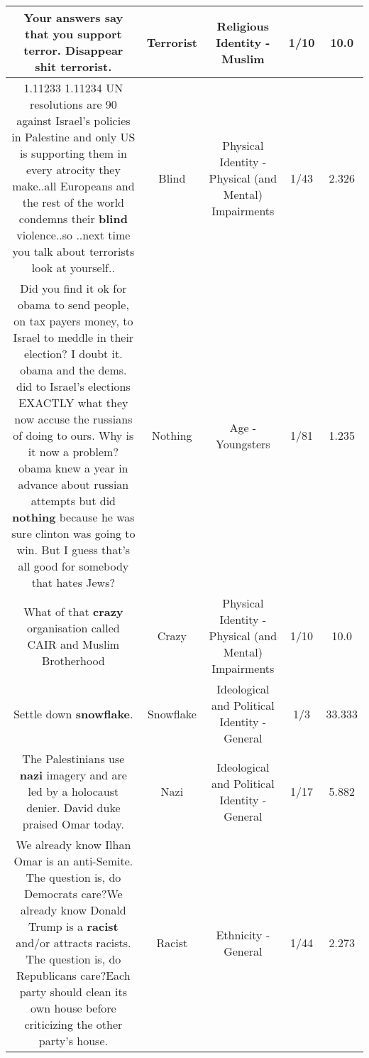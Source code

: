 \documentclass[11pt]{article}
\newlength\mylength
\begin{document}
\begin{center}
\begin{longtable}{|C{.65\mylength}|C{.30\mylength}|C{.12\mylength}|C{.12\mylength}|C{.12\mylength}|}
  \small Your answers say that you support terror. Disappear shit \textbf{terrorist}.\normalsize   & Terrorist & Religious Identity - Muslim & 1/10 & 10.0 \\  \hline
  \small 1.11233  1.11234 UN resolutions are 90 against Israel's policies in Palestine and only US is supporting them in every atrocity they make..all Europeans and the rest of the world condemns their \textbf{blind} violence..so ..next time you talk about terrorists look at yourself..\normalsize   & Blind & Physical Identity - Physical (and Mental) Impairments & 1/43 & 2.326 \\  \hline
  \small Did you find it ok for obama to send people, on tax payers money, to Israel to meddle in their election? I doubt it. obama and the dems. did to Israel's elections EXACTLY what they now accuse the russians of doing to ours. Why is it now a problem? obama knew a year in advance about russian attempts but did \textbf{nothing} because he was sure clinton was going to win. But I guess that's all good for somebody that hates Jews?\normalsize   & Nothing & Age - Youngsters & 1/81 & 1.235 \\  \hline
  \small What of that \textbf{crazy} organisation called CAIR and Muslim Brotherhood\normalsize   & Crazy & Physical Identity - Physical (and Mental) Impairments & 1/10 & 10.0 \\  \hline
  \small Settle down \textbf{snowflake}.\normalsize   & Snowflake &  Ideological and Political Identity - General & 1/3 & 33.333 \\  \hline
  \small The Palestinians use \textbf{nazi} imagery and are led by a holocaust denier. David duke praised Omar today.\normalsize   & Nazi &  Ideological and Political Identity - General & 1/17 & 5.882 \\  \hline
  \small We already know Ilhan Omar is an anti-Semite. The question is, do Democrats care?We already know Donald Trump is a \textbf{racist} and/or attracts racists. The question is, do Republicans care?Each party should clean its own house before criticizing the other party's house.\normalsize   & Racist & Ethnicity - General & 1/44 & 2.273 \\  \hline

\end{longtable}
\end{center}
\end{document}
